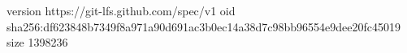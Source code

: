 version https://git-lfs.github.com/spec/v1
oid sha256:df623848b7349f8a971a90d691ac3b0ec14a38d7c98bb96554e9dee20fc45019
size 1398236
